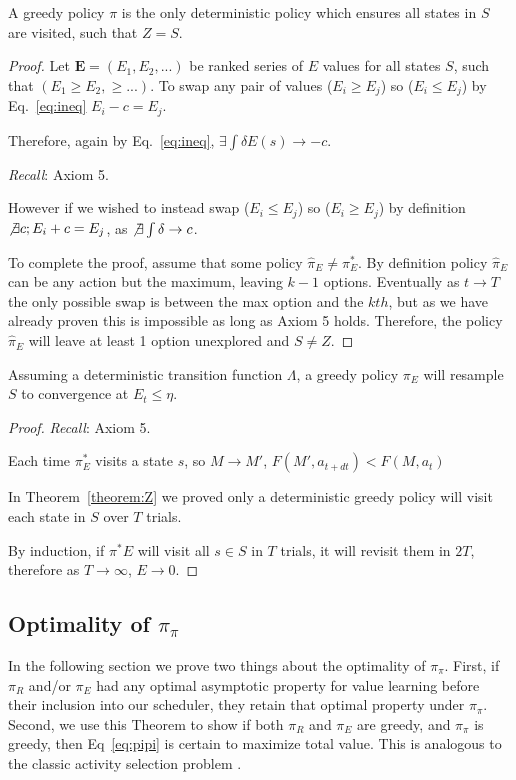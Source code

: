 \begin{theorem} \label{theorem:Z} 
	A greedy policy $\pi$ is the only deterministic policy which ensures all states in $S$ are visited, such that $Z = S$. 
\end{theorem}
\begin{proof}
	Let $\mathbf{E} = (E_1, E_2, ...)$ be ranked series of $E$ values for all states $S$, such that $(E_1 \geq E_2, \geq ...)$. To swap any pair of values ($E_i \geq E_j$) so ($E_i \leq E_j$) by Eq.~\ref{eq:ineq} $E_i - c = E_j$. 
	
	Therefore, again by Eq.~\ref{eq:ineq}, $\exists \int \delta E(s) \rightarrow -c$. 
	
	\textit{Recall}: Axiom 5.
	
	However if we wished to instead swap ($E_i \leq E_j$) so ($E_i \geq E_j$) by definition $\not \exists c; E_i + c = E_j$, as $\not \exists \int \delta \rightarrow c$. 
	
	To complete the proof, assume that some policy $\hat \pi_E \neq \pi^*_E$. By definition policy $\hat \pi_E$ can be any action but the maximum, leaving $k-1$ options. Eventually as $t \rightarrow T$ the only possible swap is between the max option and the $kth$, but as we have already proven this is impossible as long as Axiom 5 holds. Therefore, the policy $\hat \pi_E$ will leave at least 1 option unexplored and $S \neq Z$. 
\end{proof}
\begin{theorem} \label{theorem:convergence} 
	Assuming a deterministic transition function $\Lambda$, a greedy policy $\pi_E$ will resample $S$ to convergence at $E_t \leq \eta$. 
\end{theorem}
\begin{proof}
	\textit{Recall}: Axiom 5.
	
	Each time $\pi^*_E$ visits a state $s$, so $M \rightarrow M'$, $F(M', a_{t+dt}) < F(M, a_t)$
	
	In Theorem~\ref{theorem:Z} we proved only a deterministic greedy policy will visit each state in $S$ over $T$ trials.
	
	By induction, if $\pi^*E$ will visit all $s \in S$ in $T$ trials, it will revisit them in $2T$, therefore as $T \rightarrow \infty$, $E \rightarrow 0$. 
\end{proof}

\subsection*{Optimality of $\pi_{\pi}$} \label{sec:opt_pipi} 
In the following section we prove two things about the optimality of $\pi_\pi$. First, if $\pi_R$ and/or $\pi_E$ had any optimal asymptotic property for value learning before their inclusion into our scheduler, they retain that optimal property under $\pi_\pi$. Second, we use this Theorem to show if both $\pi_R$ and $\pi_E$ are greedy, and $\pi_\pi$ is greedy, then Eq~\ref{eq:pipi} is certain to maximize total value. This is analogous to the classic activity selection problem \cite{Roughgarden2019}.


